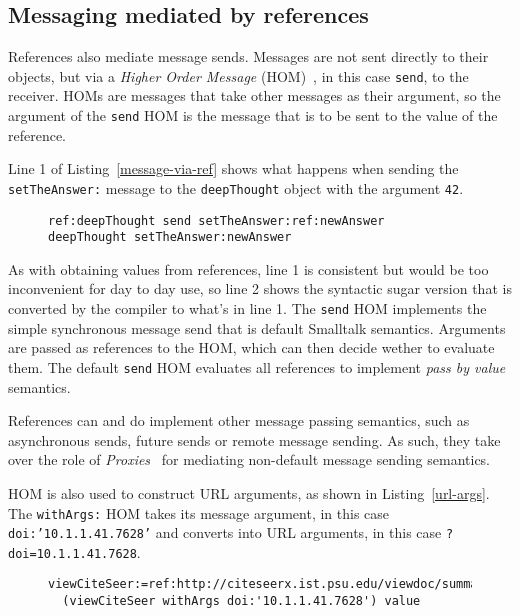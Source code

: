 \documentclass[preprint,authoryear]{llncs}
\begin{document}
\subsection{Messaging mediated by references}

References also mediate message sends.   Messages are not sent directly to their objects, but via a
\emph{Higher Order Message} (HOM)~\cite{HOM}, in this case {\tt send}, to the receiver.    HOMs
are messages that take other messages as their argument, so the argument of the {\tt send} HOM is the
message that is to be sent to the value of the reference.  

  Line 1 of Listing~\ref{message-via-ref} shows
what happens when sending the {\tt setTheAnswer:} message to the {\tt deepThought} object with
the argument {\tt 42}.

\begin{figure}[htbp]
\begin{lstlisting}[style=numbers,label=message-via-ref,caption=Message sending via reference and with syntactic sugar]
ref:deepThought send setTheAnswer:ref:newAnswer
deepThought setTheAnswer:newAnswer
\end{lstlisting}
\end{figure}

As with obtaining values from references, line 1 is consistent but would be too inconvenient for day to day use,
so line 2 shows the syntactic sugar version that is converted by the compiler to what's in line 1.  The {\tt send}
HOM implements the simple synchronous message send that is default Smalltalk semantics.   Arguments
are passed as references to the HOM, which can then decide wether to evaluate them.  The default {\tt send}
HOM evaluates all references to implement \emph{pass by value} semantics.

References can and do implement other message passing semantics, such as asynchronous sends, future
sends or remote message sending.  As such, they take over the role of \emph{Proxies}~\cite{VanCutsemMiller} for mediating non-default
message sending semantics.  


HOM is also used to construct URL arguments, as shown in Listing~\ref{url-args}.  The {\tt withArgs:}
HOM takes its message argument, in this case {\tt doi:'10.1.1.41.7628'} and converts into URL arguments,
in this case {\tt ?doi=10.1.1.41.7628}.

\begin{figure}[htbp]
\begin{lstlisting}[style=L,label=url-args,caption=URL arguments via reference and higher order message.]
  viewCiteSeer:=ref:http://citeseerx.ist.psu.edu/viewdoc/summary.
  (viewCiteSeer withArgs doi:'10.1.1.41.7628') value
\end{lstlisting}
\end{figure}
\end{document}
